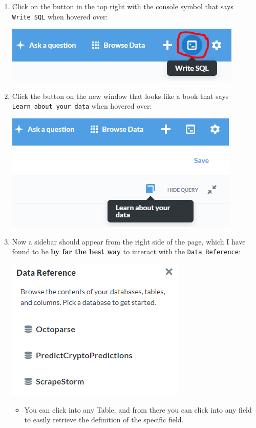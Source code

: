 \documentclass[
]{book}
\begin{document}
\begin{enumerate}
\def\labelenumi{\arabic{enumi}.}
\item
  Click on the button in the top right with the console symbol that says \texttt{Write\ SQL} when hovered over:

  \includegraphics{images/WriteSQLselect.png}
\item
  Click the button on the new window that looks like a book that says \texttt{Learn\ about\ your\ data} when hovered over:

  \includegraphics{images/LearnMoreAboutThisData.png}
\item
  Now a sidebar should appear from the right side of the page, which I have found to be \textbf{by far the best way} to interact with the \texttt{Data\ Reference}:

  \includegraphics{images/DataReference.png}

  \begin{itemize}
  \item
    You can click into any Table, and from there you can click into any field to easily retrieve the definition of the specific field.


\end{itemize}
\end{enumerate}
\end{document}

